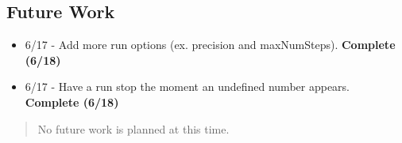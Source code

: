 \documentclass[10pt]{article}%
\begin{document}
\subsection*{Future Work}

\begin{itemize}\item  6/17 - 
Add more run options (ex. precision and maxNumSteps).
 \textbf{Complete (6/18)}
\item  6/17 - 
Have a run stop the moment an undefined number appears.
 \textbf{Complete (6/18)}
\end{itemize}
\begin{quotation} No future work is planned at this time.\end{quotation}
    

%
\end{document}
